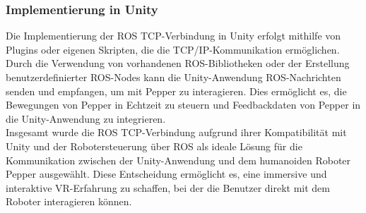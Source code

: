 \subsubsection{Implementierung in Unity}

Die Implementierung der ROS TCP-Verbindung in Unity erfolgt mithilfe von Plugins oder eigenen Skripten, die die TCP/IP-Kommunikation ermöglichen. Durch die Verwendung von vorhandenen ROS-Bibliotheken oder der Erstellung benutzerdefinierter ROS-Nodes kann die Unity-Anwendung ROS-Nachrichten senden und empfangen, um mit Pepper zu interagieren. Dies ermöglicht es, die Bewegungen von Pepper in Echtzeit zu steuern und Feedbackdaten von Pepper in die Unity-Anwendung zu integrieren.
\\

\noindent
Insgesamt wurde die ROS TCP-Verbindung aufgrund ihrer Kompatibilität mit Unity und der Robotersteuerung über ROS als ideale Lösung für die Kommunikation zwischen der Unity-Anwendung und dem humanoiden Roboter Pepper ausgewählt. Diese Entscheidung ermöglicht es, eine immersive und interaktive VR-Erfahrung zu schaffen, bei der die Benutzer direkt mit dem Roboter interagieren können.